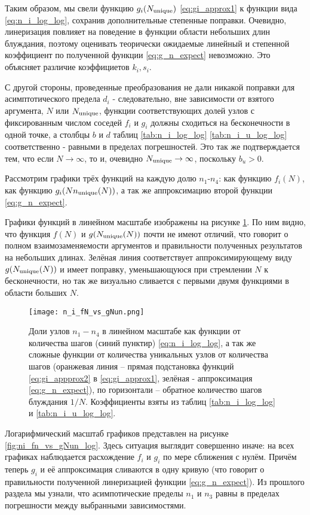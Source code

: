 Таким образом, мы свели функцию $g_i(N_{\textup{unique}})$ \eqref{eq:gi_approx1} к функции вида \eqref{eq:n_i_log_log}, сохранив дополнительные степенные поправки. 
Очевидно, линеризация повлияет на поведение в функции области небольших длин блуждания, поэтому оценивать теорически ожидаемые линейный и степенной коэффициент по полученной функции \eqref{eq:g_n_expect} невозможно.
Это объясняет различие коэффициетов $k_i, s_i$. 

С другой стороны, проведенные преобразования не дали никакой поправки для асимптотического предела $d_i$ - следовательно, вне зависимости от взятого аргумента, $N$ или $N_{\textup{unique}}$, функции соответствующих долей узлов с фиксированным числом соседей $f_i$ и $g_i$ должны сходиться на бесконечности в одной точке, а столбцы $b$ и $d$ таблиц \ref{tab:n_i_log_log} \ref{tab:n_i_u_log_log} соответственно - равными в пределах погрешностей.
Это так же подтверждается тем, что если $N \to \infty$, то и, очевидно $N_{\textup{unique}} \to \infty$, поскольку $b_u > 0$.  

Рассмотрим графики трёх функций на каждую долю $n_1$-$n_4$: как функцию $f_i(N)$, как функцию $g_i(Nn_{\textup{unique}}(N))$, а так же аппроксимацию второй функции \eqref{eq:g_n_expect}.

Графики функций в линейном масштабе изображены на рисунке \ref{fig:ni_fn_vs_gNun}. По ним видно, что функция $f(N)$ и $g(N_{\textup{unique}}(N))$ почти не имеют отличий, что говорит о полном взаимозаменяемости аргументов и правильности полученных результатов на небольших длинах. Зелёная линия соответствует аппроксимирующему виду $g(N_{\textup{unique}}(N))$ и имеет поправку, уменьшающуюся при стремлении $N$ к бесконечности, но так же визуально сливается с первыми двумя функциями в области больших $N$.

\begin{figure}
\centering
\texttt{[image: n\_i\_fN\_vs\_gNun.png]}
\caption{Доли узлов $n_1-n_4$ в линейном масштабе как функции от количества шагов (синий пунктир) \eqref{eq:n_i_log_log}, а так же сложные функции от количества уникальных узлов от количества шагов (оранжевая линия -- прямая подстановка функций  \eqref{eq:gi_appprox2} в \eqref{eq:gi_approx1}, зелёная - аппроксимация \eqref{eq:g_n_expect}), по горизонтали -- обратное количество шагов блуждания $1/N$. Коэффициенты взяты из таблиц \ref{tab:n_i_log_log} и \ref{tab:n_i_u_log_log}.}
\label{fig:ni_fn_vs_gNun}
\end{figure}

Логарифмический масштаб графиков представлен на рисунке \ref{fig:ni_fn_vs_gNun_log}. 
Здесь ситуация выглядит совершенно иначе: на всех графиках наблюдается расхождение $f_i$ и $g_i$ по мере сближения с нулём.
Причём теперь $g_i$ и её аппроксимация сливаются в одну кривую (что говорит о правильности полученной линеризацией функции \eqref{eq:g_n_expect}). 
Из прошлого раздела мы узнали, что асимпотические пределы $n_1$ и $n_3$ равны в пределах погрешности между выбранными зависимостями.

